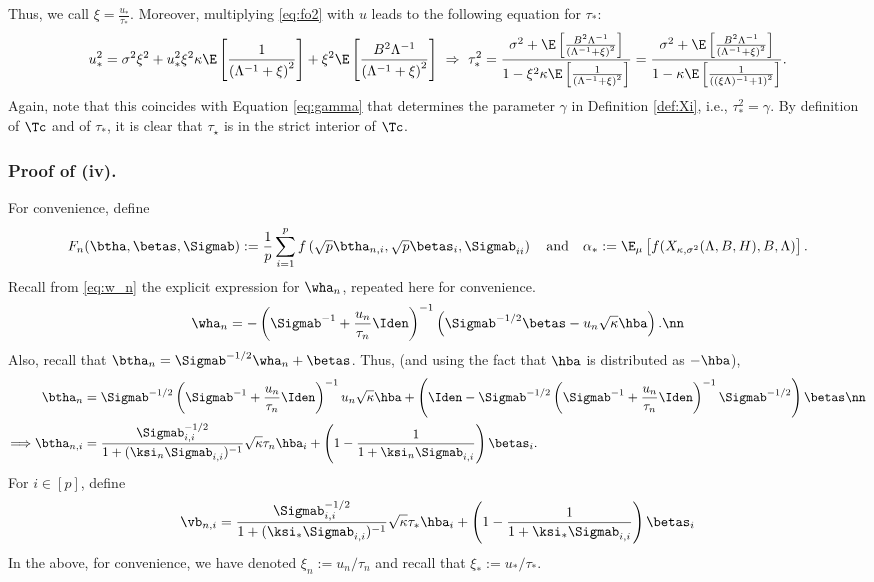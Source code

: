Thus, we call $\xi=\frac{u_*}{\tau_*}$. Moreover, multiplying \eqref{eq:fo2} with $u$ leads to the following equation for $\tau_*$:
\begin{align}
u_*^2 = \sigma^2\xi^2 + u_*^2 \xi^2  \kappa \E\left[ \frac{1}{\left(\Lambda^{-1} +\xi\right)^2}\right] + \xi^2  \E\left[ \frac{B^2\Lambda^{-1}}{\left(\Lambda^{-1} + \xi\right)^2}\right] ~\Rightarrow~ \tau_*^2 = \frac{\sigma^2 + \E\left[ \frac{B^2\Lambda^{-1}}{\left(\Lambda^{-1} + \xi\right)^2}\right]}{1-\xi^2\kappa \E\left[ \frac{1}{\left(\Lambda^{-1} +\xi\right)^2}\right]} =  \frac{\sigma^2 + \E\left[ \frac{B^2\Lambda^{-1}}{\left(\Lambda^{-1} + \xi\right)^2}\right]}{1-\kappa \E\left[ \frac{1}{\left((\xi\Lambda)^{-1} +1\right)^2}\right]}.
\end{align}
{Again, note that this coincides with Equation \eqref{eq:gamma} that determines the parameter $\gamma$ in Definition \ref{def:Xi}, i.e., $\tau_*^2 = \gamma.$ By definition of $\Tc$ and of $\tau_*$, it is clear that $\tau_\star$ is in the strict interior of $\Tc$.}

\vspace{5pt}
\subsubsection{Proof of (iv).}  For convenience, define 
$$F_n(\btha,\betas,\Sigmab):=\frac{1}{p} \sum_{i=1}^{p} f\left(\sqrt{p}\btha_{n,i},\sqrt{p}\betas_{i},\Sigmab_{ii}\right)\quad\text{and}\quad\alpha_*:=\E_\mu\left[f(X_{\kappa,\sigma^2}(\Lambda,B,H),B,\Lambda)\right].$$
Recall from \eqref{eq:w_n} the explicit expression for $\wha_n$, repeated here for convenience.
\begin{align}
\wha_n = -\left(\Sigmab^{-1}+\frac{u_n}{\tau_n}\Iden\right)^{-1}\left(\Sigmab^{-1/2}\betas-u_n\sqrt{\kappa}\hba\right).\nn
\end{align}
Also, recall that $\btha_n = \Sigmab^{-1/2}\wha_n+\betas$. Thus,  (and using the fact that $\hba$ is distributed as $-\hba$),
\begin{align}
\btha_n &=\Sigmab^{-1/2}\left(\Sigmab^{-1}+\frac{u_n}{\tau_n}\Iden\right)^{-1}u_n\sqrt{\kappa}\hba + \left(\Iden-\Sigmab^{-1/2}\left(\Sigmab^{-1}+\frac{u_n}{\tau_n}\Iden\right)^{-1}\Sigmab^{-1/2}\right)\betas\nn\\
\Longrightarrow\btha_{n,i}&=\frac{{\Sigmab_{i,i}^{-1/2}}}{1+(\ksi_n\Sigmab_{i,i})^{-1}}\sqrt{\kappa}\tau_n\hba_i +\left(1-\frac{1}{1+\ksi_n\Sigmab_{i,i}}\right)\betas_i.\label{eq:betan}
\end{align}
For $i\in[p]$, define 
\begin{align}
\vb_{n,i} = \frac{{\Sigmab_{i,i}^{-1/2}}}{1+(\ksi_*\Sigmab_{i,i})^{-1}}\sqrt{\kappa}\tau_*\hba_i +\left(1-\frac{1}{1+\ksi_*\Sigmab_{i,i}}\right)\betas_i
\end{align}
In the above, for convenience, we have denoted $\xi_n:=u_n/\tau_n$ and recall that $\xi_*:=u_*/\tau_*$. 



